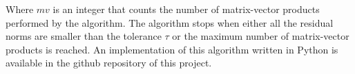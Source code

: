 \documentclass[12pt]{article}
\begin{document}
\noindent Where $mv$ is an integer that counts the number of matrix-vector products performed by the algorithm. The algorithm stops when either all the residual norms are smaller than the tolerance $\tau$ or the maximum number of matrix-vector products is reached. An implementation of this algorithm written in Python is available in the github repository \cite{ShfitedPowGMRES} of this project.

























\clearpage


\nocite{*}
\end{document}
